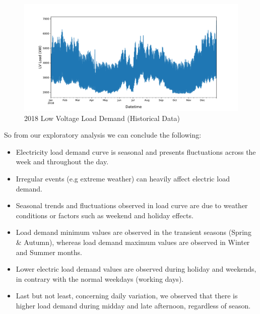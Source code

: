 \begin{figure}[htbp]
\centering
\includegraphics[width=1\linewidth]{project/eda5.pdf}

\caption{2018 Low Voltage Load Demand (Historical Data)}
\end{figure}
\par So from our exploratory analysis we can conclude the following:
\begin{itemize}
    \item Electricity load demand curve is seasonal and presents fluctuations across the week and throughout the day.
    \item Irregular events (e.g extreme weather) can heavily affect electric load demand.
    \item Seasonal trends and fluctuations observed in load curve are due to weather conditions or factors such as weekend and holiday effects.
    \item Load demand minimum values are observed in the transient seasons (Spring \& Autumn), whereas load demand maximum values are observed in Winter and Summer months.
    \item Lower electric load demand values are observed during holiday and weekends, in contrary with the normal weekdays (working days).
   \item  Last but not least, concerning daily variation, we observed that there is higher load demand during midday and late afternoon, regardless of season.
\end{itemize}
\newpage
